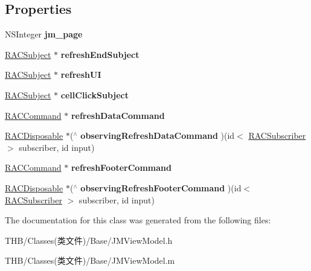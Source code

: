 \subsection*{Properties}
\begin{DoxyCompactItemize}
\item 
\mbox{\label{interface_j_m_view_model_a6bd433b92f49dbaf4ee22f817173972f}} 
N\+S\+Integer {\bfseries jm\+\_\+page}
\item 
\mbox{\label{interface_j_m_view_model_a60b0faa9e7cac7cbc2a23233e66028f4}} 
\mbox{\hyperlink{interface_r_a_c_subject}{R\+A\+C\+Subject}} $\ast$ {\bfseries refresh\+End\+Subject}
\item 
\mbox{\label{interface_j_m_view_model_ab0ec4f820494ea2ed20517e8817fb9d1}} 
\mbox{\hyperlink{interface_r_a_c_subject}{R\+A\+C\+Subject}} $\ast$ {\bfseries refresh\+UI}
\item 
\mbox{\label{interface_j_m_view_model_a7a0241867b49d06f30f22bce246d10c3}} 
\mbox{\hyperlink{interface_r_a_c_subject}{R\+A\+C\+Subject}} $\ast$ {\bfseries cell\+Click\+Subject}
\item 
\mbox{\label{interface_j_m_view_model_a1119c3ae9b28638b64a74405826b4c6f}} 
\mbox{\hyperlink{interface_r_a_c_command}{R\+A\+C\+Command}} $\ast$ {\bfseries refresh\+Data\+Command}
\item 
\mbox{\label{interface_j_m_view_model_a4dac7337bae58d0fc676733fc2c37872}} 
\mbox{\hyperlink{interface_r_a_c_disposable}{R\+A\+C\+Disposable}} $\ast$($^\wedge$ {\bfseries observing\+Refresh\+Data\+Command} )(id$<$ \mbox{\hyperlink{interface_r_a_c_subscriber}{R\+A\+C\+Subscriber}} $>$ subscriber, id input)
\item 
\mbox{\label{interface_j_m_view_model_a315b3e40d122d6ac0f0668add80da242}} 
\mbox{\hyperlink{interface_r_a_c_command}{R\+A\+C\+Command}} $\ast$ {\bfseries refresh\+Footer\+Command}
\item 
\mbox{\label{interface_j_m_view_model_a3ac589d1e0eb65e51e769811fb746b4b}} 
\mbox{\hyperlink{interface_r_a_c_disposable}{R\+A\+C\+Disposable}} $\ast$($^\wedge$ {\bfseries observing\+Refresh\+Footer\+Command} )(id$<$ \mbox{\hyperlink{interface_r_a_c_subscriber}{R\+A\+C\+Subscriber}} $>$ subscriber, id input)
\end{DoxyCompactItemize}


The documentation for this class was generated from the following files\+:\begin{DoxyCompactItemize}
\item 
T\+H\+B/\+Classes(类文件)/\+Base/J\+M\+View\+Model.\+h\item 
T\+H\+B/\+Classes(类文件)/\+Base/J\+M\+View\+Model.\+m\end{DoxyCompactItemize}
